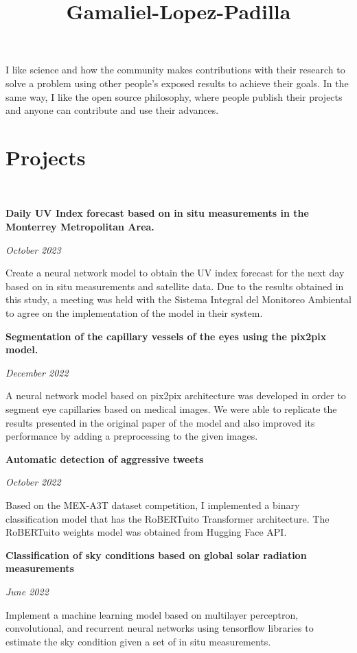 \documentclass[a3paper]{adcv_color}
\title{Gamaliel-Lopez-Padilla}
\newcommand{\proyect}[3]{\begin{minipage}{1\linewidth}
		\begin{minipage}{0.8\linewidth}
			\textbf{#1}
		\end{minipage}
		\begin{minipage}{0.19\linewidth}
			\begin{flushright}
				\vspace{#3cm}
				\textit{#2}
			\end{flushright}
		\end{minipage}
	\end{minipage}
	\vspace{-0.9cm}
}
\begin{document}
\changefontsizes{16pt}
\vspace{-0.5cm}
\begin{flushleft}
	I like science and how the community makes contributions with their research to solve a problem using other people's exposed results to achieve their goals. In the same way, I like the open source philosophy, where people publish their projects and anyone can contribute and use their advances.
\end{flushleft}
\section{Projects}\\

\proyect{Daily UV Index forecast based on in situ measurements in the Monterrey Metropolitan Area.}{October 2023}{-0.65}
\begin{flushleft}
	Create a neural network model to obtain the UV index forecast for the next day based on in situ measurements and satellite data. Due to the results obtained in this study, a meeting was held with the Sistema Integral del Monitoreo Ambiental to agree on the implementation of the model in their system.
\end{flushleft}
\proyect{Segmentation of the capillary vessels of the eyes using the pix2pix model.}{December 2022}{0}
\vspace{-0.3cm}
\begin{flushleft}
	A neural network model based on pix2pix architecture was developed in order to segment eye capillaries based on medical images. We were able to replicate the results presented in the original paper of the model and also improved its performance by adding a preprocessing to the given images.
\end{flushleft}
\proyect{Automatic detection of aggressive tweets}{October 2022}{-0.6}
\vspace{-0.3cm}
\begin{flushleft}
	Based on the MEX-A3T dataset competition, I implemented a binary classification model that has the RoBERTuito Transformer architecture. The RoBERTuito weights model was obtained from Hugging Face API.
\end{flushleft}
\proyect{Classification of sky conditions based on global solar radiation measurements}{June 2022}{0}
\vspace{-0.3cm}
\begin{flushleft}
	Implement a machine learning model based on multilayer perceptron, convolutional, and recurrent neural networks using tensorflow libraries to estimate the sky condition given a set of in situ measurements.
\end{flushleft}
\end{document}
